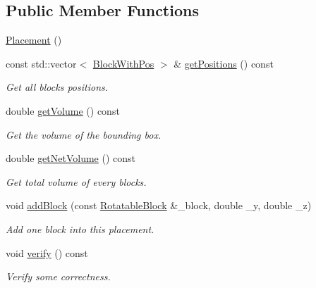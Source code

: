 \subsection*{Public Member Functions}
\begin{DoxyCompactItemize}
\item 
\hyperlink{classPlacement_aa0020a3dd0bedb34998968adfacf8a4e}{Placement} ()
\item 
const std\+::vector$<$ \hyperlink{structPlacement_1_1BlockWithPos}{Block\+With\+Pos} $>$ \& \hyperlink{classPlacement_a8d2aff015fbf652bbccae2db6c7dd7d9}{get\+Positions} () const 
\begin{DoxyCompactList}\small\item\em Get all blocks\textquotesingle{} positions. \end{DoxyCompactList}\item 
double \hyperlink{classPlacement_a686b1f2aa26ae12285a5759d1b6e5f67}{get\+Volume} () const 
\begin{DoxyCompactList}\small\item\em Get the volume of the bounding box. \end{DoxyCompactList}\item 
double \hyperlink{classPlacement_a479626954e228086398665507bed9beb}{get\+Net\+Volume} () const 
\begin{DoxyCompactList}\small\item\em Get total volume of every blocks. \end{DoxyCompactList}\item 
void \hyperlink{classPlacement_a21dc44cf496d771e5c2ac17a24ac1703}{add\+Block} (const \hyperlink{structRotatableBlock}{Rotatable\+Block} \&\+\_\+block, double \+\_\+y, double \+\_\+z)
\begin{DoxyCompactList}\small\item\em Add one block into this placement. \end{DoxyCompactList}\item 
void \hyperlink{classPlacement_a7e54624dff8703581efc6be7d1af991e}{verify} () const 
\begin{DoxyCompactList}\small\item\em Verify some correctness. \end{DoxyCompactList}\end{DoxyCompactItemize}
